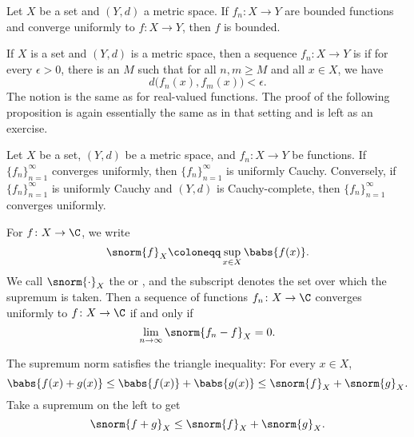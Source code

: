 \begin{prop} \label{prop:uniformconvbounded}
Let $X$ be a set and $(Y,d)$ a metric space.
If $f_n \colon X \to Y$ are bounded functions and converge uniformly to $f
\colon X \to Y$, then $f$ is bounded.
\end{prop}

If $X$ is a set and $(Y,d)$ is a metric space, then a sequence $f_n \colon X
\to Y$ is \emph{} if for every $\epsilon > 0$, there is an $M$ such that
for all $n, m \geq M$ and all $x \in X$, we have
\begin{equation*}
d\bigl(f_n(x),f_m(x)\bigr) < \epsilon .
\end{equation*}
The notion is the same as for real-valued functions.
The proof of the following proposition is
again essentially the same as in that setting and
is left as an exercise.

\begin{prop} \label{prop:unifcauchymetric}
Let $X$ be a set, $(Y,d)$ be a metric space, and
$f_n \colon X \to Y$ be functions.
If $\{ f_n \}_{n=1}^\infty$ converges uniformly,
then $\{f_n\}_{n=1}^\infty$ is uniformly Cauchy.  Conversely, if 
$\{f_n\}_{n=1}^\infty$ is uniformly Cauchy and $(Y,d)$ is Cauchy-complete,
then $\{f_n\}_{n=1}^\infty$ converges uniformly.
\end{prop}

For $f \colon X \to \C$, we write
\begin{equation*}
\snorm{f}_X \coloneqq \sup_{x \in X} \babs{f(x)} .
\end{equation*}
We call $\snorm{\cdot}_X$
the \emph{} or \emph{},
and the subscript denotes the set over which the supremum is taken.
Then a sequence of functions
$f_n \colon X \to \C$ converges uniformly to $f \colon X \to \C$ if and only if
\begin{equation*}
\lim_{n\to \infty} \snorm{f_n-f}_X = 0 .
\end{equation*}

The supremum norm satisfies the triangle inequality: For every $x \in X$,
\begin{equation*}
\babs{f(x)+g(x)} \leq
\babs{f(x)}+\babs{g(x)} \leq
\snorm{f}_X+\snorm{g}_X .
\end{equation*}
Take a supremum on the left to get
\begin{equation*}
\snorm{f+g}_X \leq
\snorm{f}_X+\snorm{g}_X .
\end{equation*}

